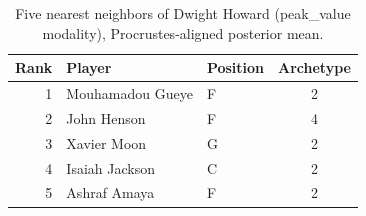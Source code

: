 \begin{table}[htbp]
  \centering\small
  \begin{tabular}{rllc}
    \toprule
    Rank & Player & Position & Archetype \\
    \midrule
    1 & Mouhamadou Gueye & F & 2 \\
    2 & John Henson & F & 4 \\
    3 & Xavier Moon & G & 2 \\
    4 & Isaiah Jackson & C & 2 \\
    5 & Ashraf Amaya & F & 2 \\
    \bottomrule
  \end{tabular}
  \caption{Five nearest neighbors of Dwight Howard (peak_value modality), Procrustes-aligned posterior mean.}
  \label{tab:Dwight_Howard_neighbors_peak_value}
\end{table}

